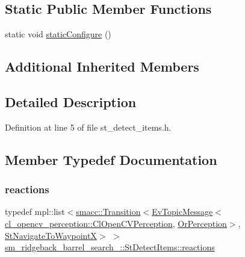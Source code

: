 \subsection*{Static Public Member Functions}
\begin{DoxyCompactItemize}
\item 
static void \hyperlink{structsm__ridgeback__barrel__search__2_1_1StDetectItems_a4bcbe01aca1085a0d4d95b53b5d2c7d2}{static\+Configure} ()
\end{DoxyCompactItemize}
\subsection*{Additional Inherited Members}


\subsection{Detailed Description}


Definition at line 5 of file st\+\_\+detect\+\_\+items.\+h.



\subsection{Member Typedef Documentation}
\mbox{\label{structsm__ridgeback__barrel__search__2_1_1StDetectItems_aaa9b572bf0f272f0170bb5fcef3ed887}} 
\subsubsection{\texorpdfstring{reactions}{reactions}}
{\footnotesize\ttfamily typedef mpl\+::list$<$\hyperlink{classsmacc_1_1Transition}{smacc\+::\+Transition}$<$\hyperlink{structsmacc_1_1default__events_1_1EvTopicMessage}{Ev\+Topic\+Message}$<$\hyperlink{classsm__ridgeback__barrel__search__2_1_1cl__opencv__perception_1_1ClOpenCVPerception}{cl\+\_\+opencv\+\_\+perception\+::\+Cl\+Open\+C\+V\+Perception}, \hyperlink{classsm__ridgeback__barrel__search__2_1_1OrPerception}{Or\+Perception}$>$, \hyperlink{structsm__ridgeback__barrel__search__2_1_1StNavigateToWaypointX}{St\+Navigate\+To\+WaypointX}$>$ $>$ \hyperlink{structsm__ridgeback__barrel__search__2_1_1StDetectItems_aaa9b572bf0f272f0170bb5fcef3ed887}{sm\+\_\+ridgeback\+\_\+barrel\+\_\+search\+\_\+::\+St\+Detect\+Items\+::reactions}}



